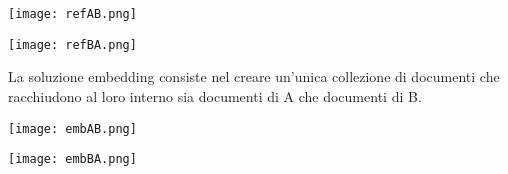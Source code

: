 \begin{center}
    \texttt{[image: refAB.png]}
\end{center}

\begin{center}
    \texttt{[image: refBA.png]}
\end{center}

La soluzione embedding consiste nel creare un'unica collezione di documenti che racchiudono al loro interno sia documenti di A che documenti di B.

\begin{center}
    \texttt{[image: embAB.png]}
\end{center}

\begin{center}
    \texttt{[image: embBA.png]}
\end{center}
